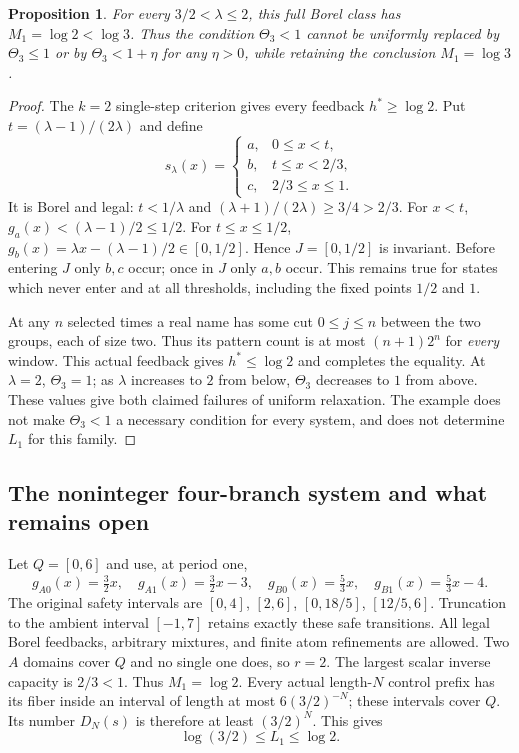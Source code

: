 \documentclass[11pt,reqno]{amsart}
\numberwithin{equation}{section}
\newtheorem{proposition}[theorem]{Proposition}
\theoremstyle{definition}
\begin{document}
\begin{proposition}\label{prop:critical}
For every $3/2<\lambda\le2$, this full Borel class has
$M_1=\log2<\log3$. Thus the condition $\Theta_3<1$ cannot be
uniformly replaced by $\Theta_3\le1$ or by
$\Theta_3<1+\eta$ for any $\eta>0$, while retaining the
conclusion $M_1=\log3$.
\end{proposition}
\begin{proof}
The $k=2$ single-step criterion gives every feedback
$h^*\ge\log2$. Put $t=(\lambda-1)/(2\lambda)$ and define
\[
 s_\lambda(x)=\begin{cases}
 a,&0\le x<t,\\ b,&t\le x<2/3,\\ c,&2/3\le x\le1.
 \end{cases}
\]
It is Borel and legal: $t<1/\lambda$ and
$(\lambda+1)/(2\lambda)\ge3/4>2/3$.
For $x<t$, $g_a(x)<(\lambda-1)/2\le1/2$.
For $t\le x\le1/2$,
$g_b(x)=\lambda x-(\lambda-1)/2\in[0,1/2]$.
Hence $J=[0,1/2]$ is invariant. Before entering $J$ only
$b,c$ occur; once in $J$ only $a,b$ occur. This remains true
for states which never enter and at all thresholds, including the
fixed points $1/2$ and $1$.

At any $n$ selected times a real name has some cut $0\le j\le n$
between the two groups, each of size two. Thus its pattern count
is at most $(n+1)2^n$ for \emph{every} window. This actual
feedback gives $h^*\le\log2$ and completes the equality.
At $\lambda=2$, $\Theta_3=1$; as $\lambda$ increases to $2$
from below, $\Theta_3$ decreases to $1$ from above. These values
give both claimed failures of uniform relaxation. The example
does not make $\Theta_3<1$ a necessary condition for every
system, and does not determine $L_1$ for this family.
\end{proof}

\subsection{The noninteger four-branch system and what remains open}
\label{subsec:four-affine}
Let $Q=[0,6]$ and use, at period one,
\[
 g_{A0}(x)=\tfrac32x,\quad g_{A1}(x)=\tfrac32x-3,
 \quad g_{B0}(x)=\tfrac53x,\quad g_{B1}(x)=\tfrac53x-4.
\]
The original safety intervals are
$[0,4]$, $[2,6]$, $[0,18/5]$, $[12/5,6]$.
Truncation to the ambient interval $[-1,7]$ retains exactly these
safe transitions. All legal Borel feedbacks, arbitrary mixtures,
and finite atom refinements are allowed. Two $A$ domains cover
$Q$ and no single one does, so $r=2$. The largest scalar
inverse capacity is $2/3<1$. Thus $M_1=\log2$.
Every actual length-$N$ control prefix has its fiber inside an
interval of length at most $6(3/2)^{-N}$; these intervals cover
$Q$. Its number $D_N(s)$ is therefore at least $(3/2)^N$.
This gives
\begin{equation}\label{eq:four-L}
 \log(3/2)\le L_1\le\log2.
\end{equation}
\end{document}
